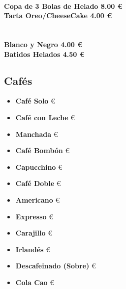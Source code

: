 \documentclass[a4paper,12pt]{article}
\begin{document}
\begin{multicols}{2}
\textbf{ } \\
\textbf{Copa de 3 Bolas de Helado \hfill \hfill 8.00 € } \\
\textbf{Tarta Oreo/CheeseCake \hfill 4.00 € } \\\\\\
\textbf{Blanco y Negro \hfill 4.00 € } \\
\textbf{Batidos Helados \hfill 4.50 € } \\
\end{multicols}

\begin{multicols}{2}
\section*{ Cafés}
\begin{itemize}
    \item \textbf{Café Solo}  €
    \item \textbf{Café con Leche}  €
    \item \textbf{Manchada}  €
    \item \textbf{Café Bombón}  €
    \item \textbf{Capucchino}  €
    \item \textbf{Café Doble}  €
    \item \textbf{Americano}  €
    \item \textbf{Expresso}  €
    \item \textbf{Carajillo}  €
    \item \textbf{Irlandés}  €
    \item \textbf{Descafeinado (Sobre)}  €
    \item \textbf{Cola Cao}  €
\end{itemize}

\columnbreak


\end{multicols}
\end{document}
